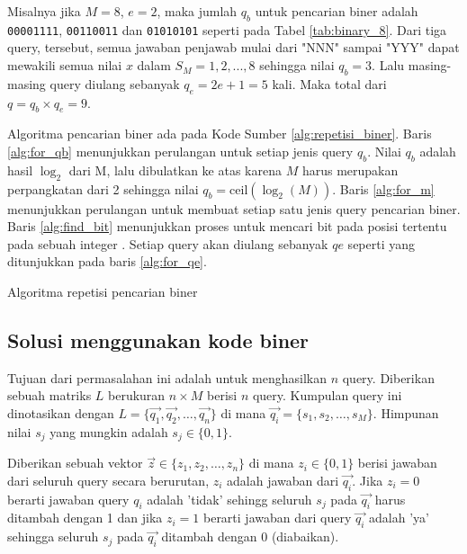 Misalnya jika $M=8$, $e=2$, maka jumlah $q_b$ untuk pencarian biner adalah \texttt{00001111}, \texttt{00110011} dan \texttt{01010101} seperti pada Tabel \ref{tab:binary_8}. Dari tiga query, tersebut, semua jawaban penjawab mulai dari "NNN" sampai "YYY" dapat mewakili semua nilai $x$ dalam $S_M={1,2,...,8}$ sehingga nilai $q_b=3$. Lalu masing-masing query diulang sebanyak $q_e=2e+1=5$ kali. Maka total dari $q=q_b \times q_e=9$.

Algoritma pencarian biner ada pada Kode Sumber \ref{alg:repetisi_biner}. Baris \ref{alg:for_qb} menunjukkan perulangan untuk setiap jenis query $q_b$. Nilai $q_b$ adalah hasil $\log_2$ dari M, lalu dibulatkan ke atas karena $M$ harus merupakan perpangkatan dari 2 sehingga nilai $q_b = \text{ceil}(\log_2(M))$. Baris \ref{alg:for_m} menunjukkan perulangan untuk membuat setiap satu jenis query pencarian biner. Baris \ref{alg:find_bit} menunjukkan proses untuk mencari bit pada posisi tertentu pada sebuah integer \cite{bithack}. Setiap query akan diulang sebanyak $qe$ seperti yang ditunjukkan pada baris \ref{alg:for_qe}.

\begin{algorithm}[h]
\caption{Algoritma repetisi pencarian biner}
\label{alg:repetisi_biner}
\end{algorithm}


\subsection{Solusi menggunakan kode biner}

Tujuan dari permasalahan ini adalah untuk menghasilkan $n$ query. Diberikan sebuah matriks $L$ berukuran $n \times M$ berisi $n$ query. Kumpulan query ini dinotasikan dengan $L = \{\vec{q_1},\vec{q_2},\ldots,\vec{q_n}\}$ di mana $\vec{q_i} = \{s_1,s_2,\ldots,s_M\}$. Himpunan nilai $s_j$ yang mungkin adalah $s_j \in \{0,1\}$.

Diberikan sebuah vektor $\vec{z} \in \{z_1,z_2,\ldots,z_n\}$ di mana $z_i \in \{0,1\}$ berisi jawaban dari seluruh query secara berurutan, $z_i$ adalah jawaban dari $\vec{q_i}$. Jika $z_i=0$ berarti jawaban query $q_i$ adalah 'tidak' sehingg seluruh $s_j$ pada $\vec{q_i}$ harus ditambah dengan 1 dan jika $z_i=1$ berarti jawaban dari query $\vec{q_i}$ adalah 'ya' sehingga seluruh $s_j$ pada $\vec{q_i}$ ditambah dengan 0 (diabaikan).

